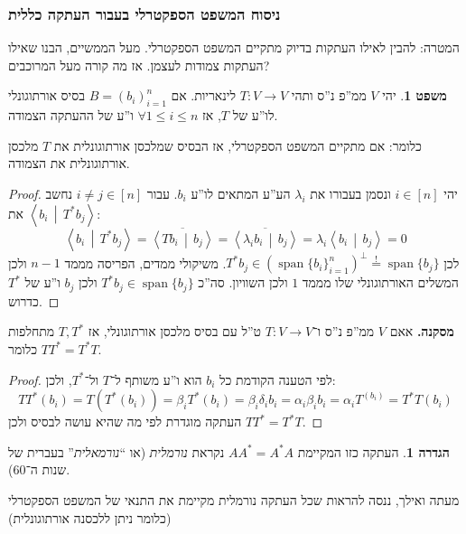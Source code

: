 \documentclass[a4paper]{article}
\newcommand\ra    {\rangle}
\newcommand\la    {\langle}
\newcommand\seq   {\overset{!}{=}}
\newcommand\ol    {\overline}
\DeclareMathOperator{\Sp}      {span}
\newcommand\co        {\colon}
\newcommand\mut [2]   {\left \la #1 \,\middle|\, #2 \right \ra}
\newcommand\ag        {\alpha}
\newcommand\bg        {\beta}
\newcommand\dg        {\delta}
\renewcommand\lg      {\lambda}
\theoremstyle{definition}
\newtheorem{Theorem}{\color{myblue}משפט}
\newtheorem{Definition}{\color{mygreen}הגדרה}
\newcommand\theo  [1] {\begin{Theorem}#1\end{Theorem}}
\newcommand\defi  [1] {\begin{Definition}#1\end{Definition}}
\begin{document}
	
	\subsubsection{ניסוח המשפט הספקטרלי בעבור העתקה כללית}
	
	המטרה: להבין לאילו העתקות בדיוק מתקיים המשפט הספקטרלי. מעל הממשיים, הבנו שאילו העתקות צמודות לעצמן. אז מה קורה מעל המרוכבים? 
	
	\theo{יהי $V$ ממ''פ נ''ס ותהי $T \co V \to V$ לינאריות. אם $B = (b_i)_{i = 1}^{n}$ בסיס אורתוגונלי לו''ע של $T$, אז $\forall 1 \le i \le n$ ו''ע של ההעתקה הצמודה. }
	כלומר: אם מתקיים המשפט הספקטרלי, אז הבסיס שמלכסן אורתוגונלית את $T$ מלכסן אורתוגונלית את הצמודה. 
	\begin{proof}
		יהי $i \in [n]$ ונסמן בעבורו את $\lg_i$ הע''ע המתאים לו''ע $b_i$. עבור $i \neq j \in [n]$ נחשב את $\mut{b_i}{T^*b_j}$: 
		\[ \mut{b_i}{T^*b_j} = \ol{\mut{Tb_i}{b_j}} = \ol{\mut{\lg _i b_i}{b_j}} = \lg_i \mut{b_i}{b_j} = 0 \]
		לכן $T^*b_j \in (\Sp\{b_i\}_{i = 1}^{n})^{\perp} \seq \Sp\{b_j\}$. משיקולי ממדים, הפריסה מממד $n - 1$ ולכן המשלים האורתוגונלי שלו מממד $1$ ולכן השוויון. סה''כ $T^* b_j \in \Sp\{b_j\}$ ולכן $b_j$ ו''ע של $T^*$ כדרוש. 
	\end{proof}
	
	\textbf{מסקנה. }אאם $V$ ממ''פ נ''ס ו־$T \co V \to V$ ט''ל עם בסיס מלכסן אורתוגונלי, אז $T, T^*$ מתחלפות כלומר $TT^* = T^*T$. \begin{proof}
		לפי הטענה הקודמת כל $b_i$ הוא ו''ע משותף ל־$T$ ול־$T^*$, ולכן: 
		\[ TT^*(b_i) = T(T^*(b_i)) = \bg_i T^*(b_i) = \bg_i \dg_i b_i = \ag_i \bg_i b_i = \ag_i T^(b_i) = T^*T(b_i) \]
		העתקה מוגדרת לפי מה שהיא עושה לבסיס ולכן $TT^* = T^*T$. 
	\end{proof}
	\defi{העתקה כזו המקיימת $AA^* = A^*A$ נקראת \textit{נורמלית} (או ``\textit{נורמאלית}'' בעברית של שנות ה־60). }
	
	מעתה ואילך, ננסה להראות שכל העתקה נורמלית מקיימת את התנאי של המשפט הספקטרלי (כלומר ניתן ללכסנה אורתוגונלית)
	
\end{document}
